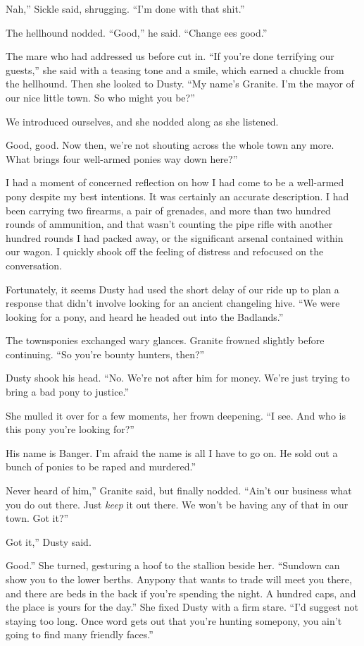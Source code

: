 \leavevmode{}Nah,” Sickle said, shrugging. “I’m done with that shit.”

The hellhound nodded. “Good,” he said. “Change ees good.”

The mare who had addressed us before cut in. “If you’re done terrifying our guests,” she said with a teasing tone and a smile, which earned a chuckle from the hellhound. Then she looked to Dusty. “My name’s Granite. I’m the mayor of our nice little town. So who might you be?”

We introduced ourselves, and she nodded along as she listened.

\leavevmode{}Good, good. Now then, we’re not shouting across the whole town any more. What brings four well-armed ponies way down here?”

I had a moment of concerned reflection on how I had come to be a well-armed pony despite my best intentions. It was certainly an accurate description. I had been carrying two firearms, a pair of grenades, and more than two hundred rounds of ammunition, and that wasn’t counting the pipe rifle with another hundred rounds I had packed away, or the significant arsenal contained within our wagon. I quickly shook off the feeling of distress and refocused on the conversation.

Fortunately, it seems Dusty had used the short delay of our ride up to plan a response that didn’t involve looking for an ancient changeling hive. “We were looking for a pony, and heard he headed out into the Badlands.”

The townsponies exchanged wary glances. Granite frowned slightly before continuing. “So you’re bounty hunters, then?”

Dusty shook his head. “No. We’re not after him for money. We’re just trying to bring a bad pony to justice.”

She mulled it over for a few moments, her frown deepening. “I see. And who is this pony you’re looking for?”

\leavevmode{}His name is Banger. I’m afraid the name is all I have to go on. He sold out a bunch of ponies to be raped and murdered.”

\leavevmode{}Never heard of him,” Granite said, but finally nodded. “Ain’t our business what you do out there. Just \textit{keep} it out there. We won’t be having any of that in our town. Got it?”

\leavevmode{}Got it,” Dusty said.

\leavevmode{}Good.” She turned, gesturing a hoof to the stallion beside her. “Sundown can show you to the lower berths. Anypony that wants to trade will meet you there, and there are beds in the back if you’re spending the night. A hundred caps, and the place is yours for the day.” She fixed Dusty with a firm stare. “I’d suggest not staying too long. Once word gets out that you’re hunting somepony, you ain’t going to find many friendly faces.”

